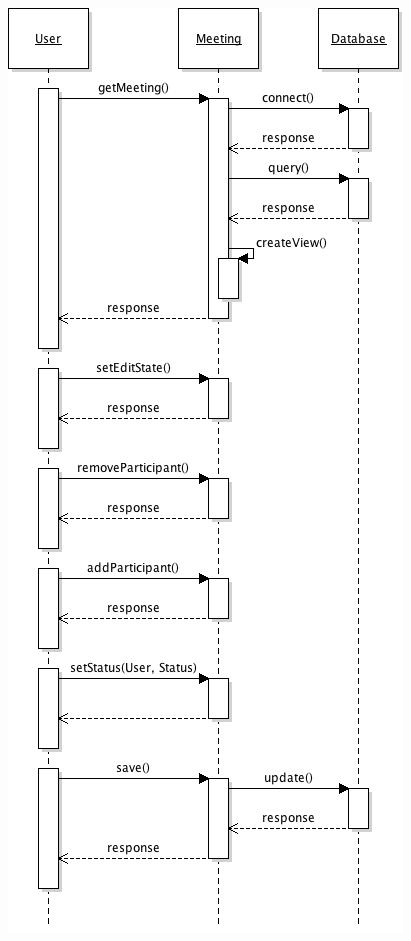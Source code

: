 \begin{center}
\begin{enumerate}
{\begin{minipage}[t]{\linewidth}
{					\includegraphics[width=\textwidth,height=\textheight,keepaspectratio]{seq3.jpg}
}
\end{minipage}}
\end{enumerate}
\end{center}
